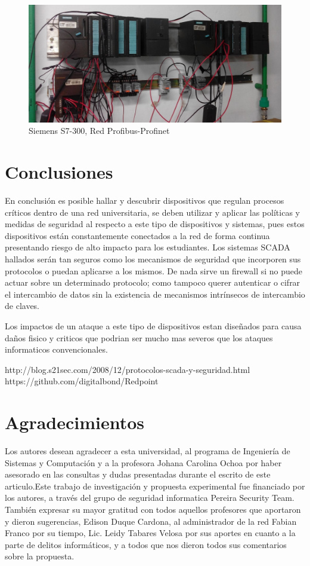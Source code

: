 \documentclass[jou,apacite]{apa6}   %
\begin{document}
\begin{figure}[htb]
\centering
\includegraphics[scale=0.2]{images/s73002.jpg}
\caption{Siemens S7-300, Red Profibus-Profinet} \label{fig:s73002}
\end{figure}
\newpage
\section{Conclusiones }
En conclusión es posible hallar y descubrir dispositivos que regulan procesos críticos dentro de una red universitaria, se deben utilizar y aplicar las políticas y medidas de seguridad al respecto a este tipo de dispositivos y sistemas, pues estos dispositivos están constantemente conectados a la red de forma continua presentando riesgo de alto impacto para los estudiantes. Los sistemas SCADA hallados serán tan seguros como los  mecanismos de seguridad que incorporen sus protocolos o puedan aplicarse a los mismos. De nada sirve un firewall si no puede actuar sobre un determinado protocolo; como tampoco querer autenticar o cifrar el intercambio de datos sin la existencia de mecanismos intrínsecos de intercambio de claves.

Los impactos de un ataque a este tipo de dispositivos estan diseñados para causa daños 
fisico y criticos que podrian ser mucho mas severos que los ataques informaticos convencionales.

http://blog.s21sec.com/2008/12/protocolos-scada-y-seguridad.html
https://github.com/digitalbond/Redpoint

\section{Agradecimientos }
Los autores desean agradecer a esta universidad, al programa de Ingeniería de Sistemas y Computación y a la profesora Johana Carolina Ochoa por haber asesorado en las consultas y dudas presentadas durante el escrito de este articulo.Este trabajo de investigación y propuesta experimental fue financiado por los autores, a través del grupo de seguridad informatica Pereira Security Team. También expresar su mayor gratitud con todos aquellos profesores que aportaron y dieron sugerencias, Edison Duque Cardona, al administrador de la red Fabian Franco por su tiempo, Lic. Leidy Tabares Velosa por sus aportes en cuanto a la parte de delitos informáticos, y a todos que nos dieron todos sus comentarios sobre la propuesta. 
\newpage
 

\end{document}
